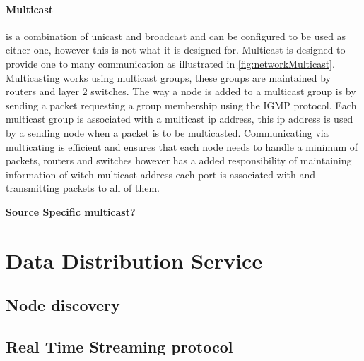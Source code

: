 \paragraph{Multicast}
is a combination of unicast and broadcast and can be configured to be used as either one, however this is not what it is designed for. Multicast is designed to provide one to many communication as illustrated in \cref{fig:networkMulticast}.
Multicasting works using multicast groups, these groups are maintained by routers and layer 2 switches. The way a node is added to a multicast group is by sending a packet requesting a group membership using the IGMP protocol. Each multicast group is associated with a multicast ip address, this ip address is used by a sending node when a packet is to be multicasted.
Communicating via multicating is efficient and ensures that each node needs to handle a minimum of packets, routers and switches however has a added responsibility of maintaining information of witch multicast address each port is associated with and transmitting packets to all of them.


\textbf{Source Specific multicast?}

\section{Data Distribution Service}

\subsection{Node discovery}

\subsection{Real Time Streaming protocol}